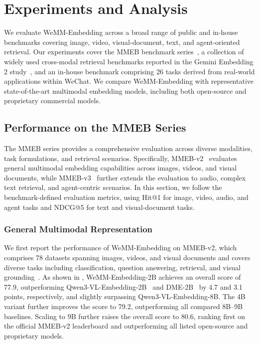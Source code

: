 \documentclass[]{wechat}
\begin{document}
\section{Experiments and Analysis}
\label{sec:experiments}

We evaluate WeMM-Embedding across a broad range of public and in-house benchmarks covering image, video, visual-document, text, and agent-oriented retrieval. Our experiments cover the MMEB benchmark series~\cite{vlm2vec-v2,mmeb-v3}, a collection of widely used cross-modal retrieval benchmarks reported in the Gemini Embedding 2 study~\cite{gemini-emb-2}, and an in-house benchmark comprising 26 tasks derived from real-world applications within WeChat. We compare WeMM-Embedding with representative state-of-the-art multimodal embedding models, including both open-source and proprietary commercial models.

\subsection{Performance on the MMEB Series}
\label{subsec:mmeb_series}

The MMEB series provides a comprehensive evaluation across diverse modalities, task formulations, and retrieval scenarios. Specifically, MMEB-v2~\cite{vlm2vec-v2} evaluates general multimodal embedding capabilities across images, videos, and visual documents, while MMEB-v3~\cite{mmeb-v3} further extends the evaluation to audio, complex text retrieval, and agent-centric scenarios. In this section, we follow the benchmark-defined evaluation metrics, using Hit@1 for image, video, audio, and agent tasks and NDCG@5 for text and visual-document tasks.


\subsubsection{General Multimodal Representation}
\label{subsec:general_multimodal_representation}

We first report the performance of WeMM-Embedding on MMEB-v2, which comprises 78 datasets spanning images, videos, and visual documents and covers diverse tasks including classification, question answering, retrieval, and visual grounding~\cite{vlm2vec-v2}. As shown in , WeMM-Embedding-2B achieves an overall score of 77.9, outperforming Qwen3-VL-Embedding-2B~\cite{qwen3vl-emb} and DME-2B~\cite{DME} by 4.7 and 3.1 points, respectively, and slightly surpassing Qwen3-VL-Embedding-8B. The 4B variant further improves the score to 79.2, outperforming all compared 8B--9B baselines. Scaling to 9B further raises the overall score to 80.6, ranking first on the official MMEB-v2 leaderboard and outperforming all listed open-source and proprietary models.
\end{document}
